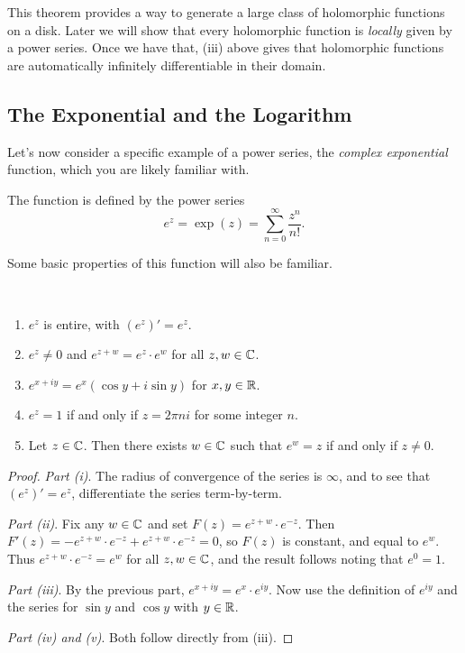 \documentclass[a4paper]{scrartcl}
\begin{document}
\begin{remark}
    This theorem provides a way to generate a large class of holomorphic functions on a disk. Later we will show that every holomorphic function is \emph{locally} given by a power series. Once we have that, (iii) above gives that holomorphic functions are automatically infinitely differentiable in their domain.
\end{remark}

\subsection{The Exponential and the Logarithm}

Let's now consider a specific example of a power series, the \emph{complex exponential} function, which you are likely familiar with.

\begin{definition}
    The  function is defined by the power series
    $$
    e^z = \exp(z) = \sum_{n = 0}^{\infty} \frac{z^n}{n!}.
    $$
\end{definition}

Some basic properties of this function will also be familiar.

\begin{proposition}~
        \vspace*{-1.5\baselineskip}
    \begin{enumerate}[label=(\roman*)]
        \item $e^z$ is entire, with $(e^z)' = e^z$.
        \item $e^z \neq 0$ and $e^{z + w} = e^z  \cdot e^w$ for all $z, w \in \mathbb{C}$.
        \item $e^{x + iy} = e^x(\cos y + i \sin y)$ for $x, y \in \mathbb{R}$.
        \item $e^z = 1$ if and only if $z = 2\pi n i$ for some integer $n$.
        \item Let $z \in \mathbb{C}$. Then there exists $w \in \mathbb{C}$ such that $e^w = z$ if and only if $z \neq 0$.
    \end{enumerate}
\end{proposition}
\begin{proof}
    \emph{Part (i)}. The radius of convergence of the series is $\infty$, and to see that $(e^z)' = e^z$, differentiate the series term-by-term.

    \emph{Part (ii)}. Fix any $w \in \mathbb{C}$ and set $F(z) = e^{z + w} \cdot e^{-z}$. Then $F'(z) = - e^{z + w} \cdot e^{-z} + e^{z + w} \cdot e^{-z} = 0$, so $F(z)$ is constant, and equal to $e^w$. Thus $e^{z + w} \cdot e^{-z} = e^w$ for all $z, w \in \mathbb{C}$, and the result follows noting that $e^0 = 1$.

    \emph{Part (iii)}. By the previous part, $e^{x + iy} = e^x \cdot e^{iy}$. Now use the definition of $e^{iy}$ and the series for $\sin y$ and $\cos y$ with $y \in \mathbb{R}$.

    \emph{Part (iv) and (v)}. Both follow directly from (iii).
\end{proof}
\end{document}
